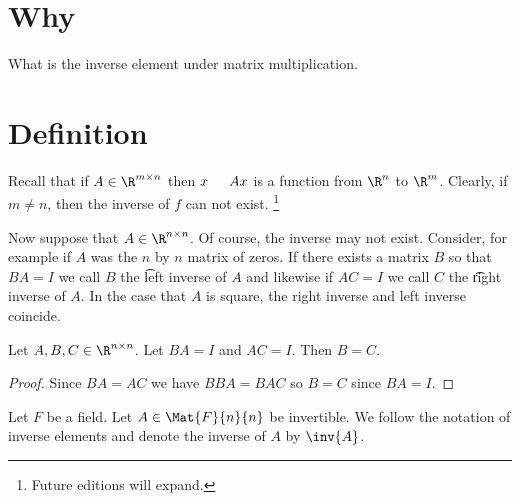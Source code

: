 
\section*{Why}

What is the inverse element under matrix multiplication.

\section*{Definition}

Recall that if $A \in \R ^{m \times  n}$ then $x \indent Ax$ is a function from $\R ^{n}$ to $\R ^{m}$.
Clearly, if $m \neq n$, then the inverse of $f$ can not exist.
  \ifhmode\unskip\fi\footnote{
Future editions will expand.
  }

Now suppose that $A \in \R ^{n \times  n}$.
Of course, the inverse may not exist.
Consider, for example if $A$ was the $n$ by $n$ matrix of zeros.
If there exists a matrix $B$ so that $BA = I$ we call $B$ the \t{left inverse} of $A$ and likewise if $AC = I$ we call $C$ the \t{right inverse} of $A$.
In the case that $A$ is square, the right inverse and left inverse coincide.

\begin{proposition}
Let $A, B, C \in \R ^{n \times  n}$.
Let $BA = I$ and $AC = I$.
Then $B = C$.
\begin{proof}
Since $BA = AC$ we have $BBA = BAC$ so $B = C$ since $BA = I$.
\end{proof}
\end{proposition}


Let $F$ be a field.
Let $A \in \Mat{F}{n}{n}$
be invertible.
We follow the notation of
inverse elements and denote
the inverse of $A$ by
$\inv{A}$.

\blankpage